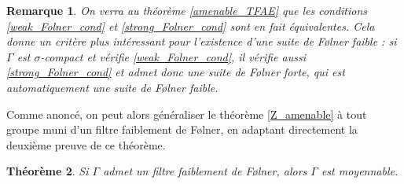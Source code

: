 \documentclass[a4paper,12pt]{article}
\newtheorem{theorem}{Théorème}[section]
\newtheorem{remark}[theorem]{Remarque}
\begin{document}
\begin{remark}
    On verra au théorème \ref{amenable_TFAE} que les conditions \eqref{weak_Folner_cond} et \eqref{strong_Folner_cond} sont en fait équivalentes.
    Cela donne un critère plus intéressant pour l'existence d'une suite de F\o{}lner faible : si $\Gamma$ 
    est $\sigma$-compact et vérifie \eqref{weak_Folner_cond}, il vérifie aussi \eqref{strong_Folner_cond} et admet 
    donc une suite de F\o{}lner forte, qui est automatiquement une suite de F\o{}lner faible.
\end{remark}

Comme anoncé, on peut alors généraliser le théorème \ref{Z_amenable} à tout groupe muni d'un filtre faiblement de F\o{}lner,
en adaptant directement la deuxième preuve de ce théorème.

\begin{theorem}\label{amenable_of_Folner}
    Si $\Gamma$ admet un filtre faiblement de F\o{}lner, alors $\Gamma$ est moyennable.
\end{theorem}
\end{document}
